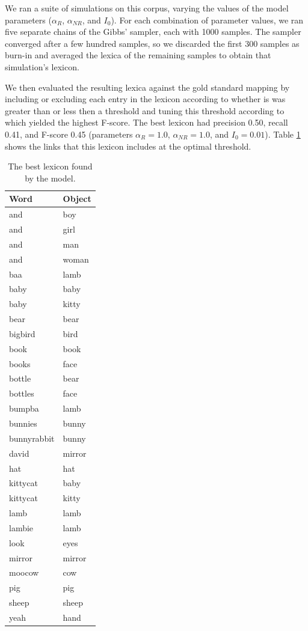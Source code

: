 \documentclass[man,noapacite,12pt]{apa2}
\begin{document}
We ran a suite of simulations on this corpus, varying the values of the model parameters ($\alpha_R$, $\alpha_{NR}$, and $I_0$). For each combination of parameter values, we ran five separate chains of the Gibbs' sampler, each with 1000 samples. The sampler converged after a few hundred samples, so we discarded the first 300 samples as burn-in and averaged the lexica of the remaining samples to obtain that simulation's lexicon.

We then evaluated the resulting lexica against the gold standard mapping by including or excluding each entry in the lexicon according to whether is was greater than or less then a threshold and tuning this threshold according to which yielded the highest F-score. The best lexicon had precision 0.50, recall 0.41, and F-score 0.45 (parameters $\alpha_R=1.0$, $\alpha_{NR}=1.0$, and $I_0=0.01$). Table \ref{table:lexicon} shows the links that this lexicon includes at the optimal threshold.

\begin{table}
\singlespacing
\small
\begin{tabular}{l l}
\hline
Word & Object \\ \hline
and & boy\\
and & girl\\
and & man\\
and & woman\\
baa & lamb\\
baby & baby\\
baby & kitty\\
bear & bear\\
bigbird & bird\\
book & book\\
books & face\\
bottle & bear\\
bottles & face\\
bumpba & lamb\\
bunnies & bunny\\
bunnyrabbit & bunny\\
david & mirror\\
hat & hat\\
kittycat & baby\\
kittycat & kitty\\
lamb & lamb\\
lambie & lamb\\
look & eyes\\
mirror & mirror\\
moocow & cow\\
pig & pig\\
sheep & sheep\\
yeah & hand
\end{tabular}
\caption{The best lexicon found by the model.}
\label{table:lexicon}
\end{table}
\end{document}
